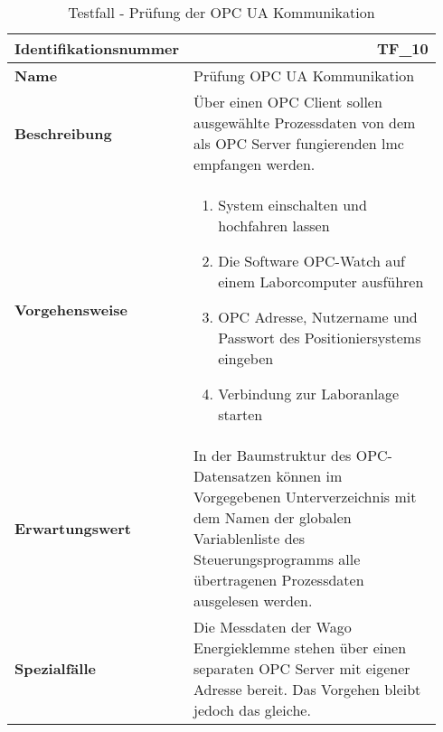 \documentclass[../../../Bachelorarbeit.tex]{subfiles}
\begin{document}
\begin{table}[H]
    \centering
    \begin{tabular}{ p{0.34\linewidth}  p{0.6\linewidth} }
        \hline
        \textbf{Identifikationsnummer}  & \multicolumn{1}{r}{TF\_10} \\ \hline
        \textbf{Name}                   & Prüfung OPC UA Kommunikation \\
        \textbf{Beschreibung}           & Über einen OPC Client sollen ausgewählte Prozessdaten von dem als OPC Server fungierenden \acs{lmc} empfangen werden. \\
        \textbf{Vorgehensweise}         &   {\begin{enumerate}[noitemsep,topsep=0pt,parsep=0pt,partopsep=0pt,leftmargin=*]
                                                \item System einschalten und hochfahren lassen
                                                \item Die Software OPC-Watch auf einem Laborcomputer ausführen
                                                \item OPC Adresse, Nutzername und Passwort des Positioniersystems eingeben
                                                \item Verbindung zur Laboranlage starten
                                            \end{enumerate}} \\
        \textbf{Erwartungswert}         & In der Baumstruktur des OPC-Datensatzen können im Vorgegebenen Unterverzeichnis mit dem Namen der globalen Variablenliste des Steuerungsprogramms alle übertragenen Prozessdaten ausgelesen werden. \\
        \textbf{Spezialfälle}           & Die Messdaten der Wago Energieklemme stehen über einen separaten OPC Server mit eigener Adresse bereit. Das Vorgehen bleibt jedoch das gleiche. \\ \hline
    \end{tabular}
    \caption[\acs{tf} - OPC UA Komminikation]{Testfall - Prüfung der OPC UA Kommunikation}
    \label{tab:my-table80}
\end{table}
\end{document}
